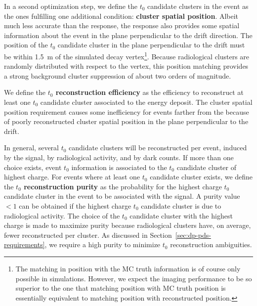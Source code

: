 In a second optimization step, we define the $t_0$ candidate clusters in the event as the ones fulfilling one additional condition: {\bf cluster spatial position}. Albeit much less accurate than the  response, the  response also provides some spatial information about the event in the plane perpendicular to the drift direction. The position of the $t_0$ candidate cluster in the plane perpendicular to the drift must be within \SI{1.5}{\m} of the simulated  decay vertex\footnote{The matching in position with the MC truth information is of course only possible in simulations. However, we expect the  imaging performance to be so superior to the  one that matching  position with MC truth position is essentially equivalent to matching  position with  reconstructed position.}. Because radiological clusters are randomly distributed with respect to the  vertex, this position matching provides a strong background cluster suppression of about two orders of magnitude.

We define the {\bf {} $t_0$ reconstruction efficiency} as the efficiency to reconstruct at least one $t_0$ candidate cluster associated to the  energy deposit. The cluster spatial position requirement causes some inefficiency for events farther from the  because of poorly reconstructed cluster spatial position in the plane perpendicular to the drift.

In general, several $t_0$ candidate clusters will be reconstructed per event, induced by the  signal, by radiological activity, and by  dark counts. If more than one choice exists, event $t_0$ information is associated to the $t_0$ candidate cluster of highest charge. For events where at least one $t_0$ candidate cluster exists, we define the {\bf {} $t_0$ reconstruction purity} as the probability for the highest charge $t_0$ candidate cluster in the event to be associated with the  signal. A purity value $<1$ can be obtained if the highest charge $t_0$ candidate cluster is due to radiological activity. The choice of the $t_0$ candidate cluster with the highest charge is made to maximize purity because radiological clusters have, on average, fewer reconstructed  per cluster. As discussed in Section~\ref{sec:dp-pds-requirements}, we require a high purity to minimize $t_0$ reconstruction ambiguities.
%

